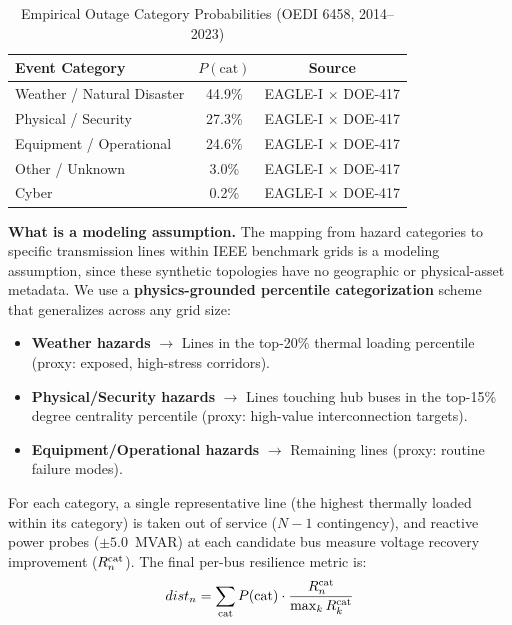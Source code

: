 \documentclass[11pt]{article}
\begin{document}
\begin{table}[h!]
\centering
\caption{Empirical Outage Category Probabilities (OEDI 6458, 2014--2023)}
\label{tab:outage-probs}
\vspace{0.5em}
\begin{tabular}{lcc}
\toprule
\textbf{Event Category} & \textbf{$P(\text{cat})$} & \textbf{Source} \\
\midrule
Weather / Natural Disaster & 44.9\% & \cellcolor{green!15}EAGLE-I $\times$ DOE-417 \\
Physical / Security       & 27.3\% & \cellcolor{green!15}EAGLE-I $\times$ DOE-417 \\
Equipment / Operational   & 24.6\% & \cellcolor{green!15}EAGLE-I $\times$ DOE-417 \\
Other / Unknown           &  3.0\% & \cellcolor{green!15}EAGLE-I $\times$ DOE-417 \\
Cyber                     &  0.2\% & \cellcolor{green!15}EAGLE-I $\times$ DOE-417 \\
\bottomrule
\end{tabular}
\end{table}

\textbf{What is a modeling assumption.}
The mapping from hazard categories to specific transmission lines within IEEE benchmark grids is a modeling assumption, since these synthetic topologies have no geographic or physical-asset metadata. We use a \textbf{physics-grounded percentile categorization} scheme that generalizes across any grid size:
\begin{itemize}[leftmargin=*,noitemsep,topsep=0pt]
  \item \textbf{Weather hazards} $\rightarrow$ Lines in the top-20\% thermal loading percentile (proxy: exposed, high-stress corridors).
  \item \textbf{Physical/Security hazards} $\rightarrow$ Lines touching hub buses in the top-15\% degree centrality percentile (proxy: high-value interconnection targets).
  \item \textbf{Equipment/Operational hazards} $\rightarrow$ Remaining lines (proxy: routine failure modes).
\end{itemize}
For each category, a single representative line (the highest thermally loaded within its category) is taken out of service ($N-1$ contingency), and reactive power probes ($\pm 5.0$~MVAR) at each candidate bus measure voltage recovery improvement ($R_n^{\rm cat}$). The final per-bus resilience metric is:
\begin{equation}
dist_n = \sum_{\text{cat}} P(\text{cat}) \cdot \frac{R_n^{\rm cat}}{\max_k R_k^{\rm cat}}
\end{equation}
\end{document}
